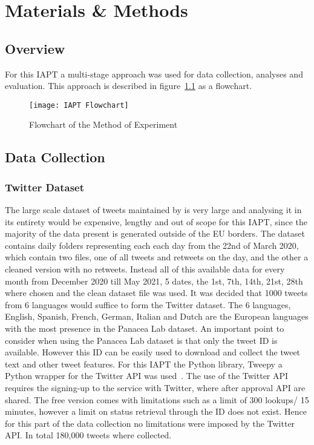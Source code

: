 \chapter{Materials \& Methods}

\section{Overview}

For this \ac{IAPT} a multi-stage approach was used for data collection, analyses and evaluation.
This approach is described in figure~\ref{fig:flowchart} as a flowchart.

\begin{figure}[h!]
\texttt{[image: IAPT Flowchart]}
\caption[Method Flowchart]{Flowchart of the Method of Experiment}
\label{fig:flowchart}
\end{figure}

\section{Data Collection}

\subsection{Twitter Dataset}

The large scale dataset of tweets maintained by \citet{banda2020largescale} is very large and analysing it in its entirety would be expensive, lengthy and out of scope for this \ac{IAPT}, since the majority of the data present is generated outside of the \ac{EU} borders.
The dataset contains daily folders representing each each day from the 22nd of March 2020, which contain two files, one of all tweets and retweets on the day, and the other a cleaned version with no retweets.
Instead all of this available data for every month from December 2020 till May 2021, 5 dates, the 1st, 7th, 14th, 21st, 28th where chosen and the clean dataset file was used.
It was decided that 1000 tweets from 6 languages would suffice to form the Twitter dataset.
The 6 languages, English, Spanish, French, German, Italian and Dutch are the European languages with the most presence in the Panacea Lab dataset.
An important point to consider when using the Panacea Lab dataset is that only the tweet ID is available.
However this ID can be easily used to download and collect the tweet text and other tweet features.
For this \ac{IAPT} the Python library, Tweepy a Python wrapper for the Twitter \ac{API} was used~\citep{roesslein2020tweepy}.
The use of the Twitter \ac{API} requires the signing-up to the service with Twitter, where after approval \ac{API} are shared.
The free version comes with limitations such as a limit of 300 lookups/ 15 minutes, however a limit on status retrieval through the ID does not exist.
Hence for this part of the data collection no limitations were imposed by the Twitter \ac{API}.
In total 180,000 tweets where collected.

